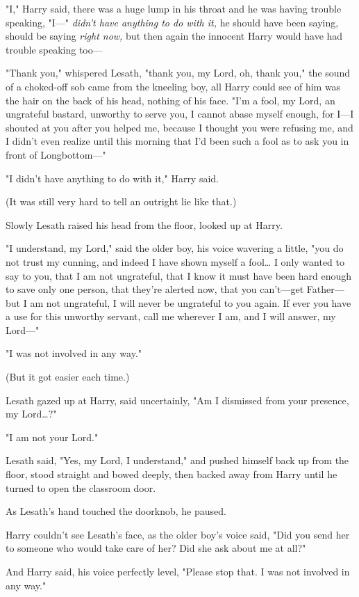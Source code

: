 "I," Harry said, there was a huge lump in his throat and he was having trouble 
speaking, "I---" \emph{didn't have anything to do with it,} he should have been 
saying, should be saying \emph{right now,} but then again the innocent Harry 
would have had trouble speaking too---

"Thank you," whispered Lesath, "thank you, my Lord, oh, thank you," the sound 
of a choked-off sob came from the kneeling boy, all Harry could see of him was 
the hair on the back of his head, nothing of his face. "I'm a fool, my Lord, an 
ungrateful bastard, unworthy to serve you, I cannot abase myself enough, for 
I---I shouted at you after you helped me, because I thought you were refusing 
me, and I didn't even realize until this morning that I'd been such a fool as 
to ask you in front of Longbottom---"

"I didn't have anything to do with it," Harry said.

(It was still very hard to tell an outright lie like that.)

Slowly Lesath raised his head from the floor, looked up at Harry.

"I understand, my Lord," said the older boy, his voice wavering a little, "you 
do not trust my cunning, and indeed I have shown myself a fool{\ldots} I only 
wanted to say to you, that I am not ungrateful, that I know it must have been 
hard enough to save only one person, that they're alerted now, that you 
can't---get Father---but I am not ungrateful, I will never be ungrateful to you 
again. If ever you have a use for this unworthy servant, call me wherever I am, 
and I will answer, my Lord---"

"I was not involved in any way."

(But it got easier each time.)

Lesath gazed up at Harry, said uncertainly, "Am I dismissed from your presence, 
my Lord{\ldots}?"

"I am not your Lord."

Lesath said, "Yes, my Lord, I understand," and pushed himself back up from the 
floor, stood straight and bowed deeply, then backed away from Harry until he 
turned to open the classroom door.

As Lesath's hand touched the doorknob, he paused.

Harry couldn't see Lesath's face, as the older boy's voice said, "Did you send 
her to someone who would take care of her? Did she ask about me at all?"

And Harry said, his voice perfectly level, "Please stop that. I was not 
involved in any way."

